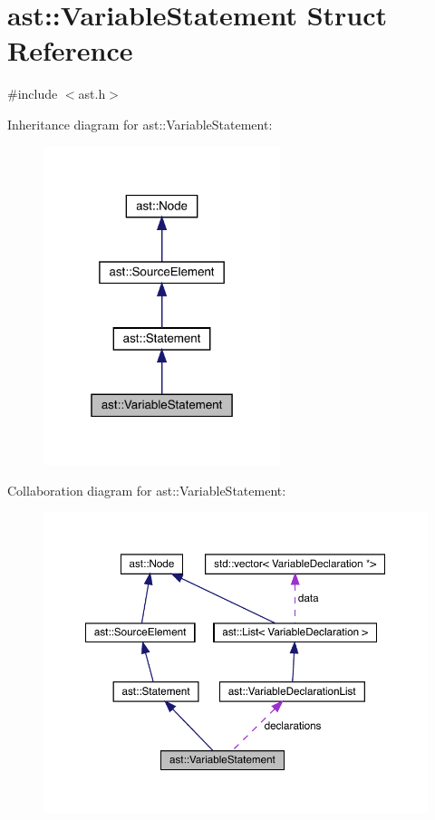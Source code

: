 \hypertarget{structast_1_1_variable_statement}{}\section{ast\+:\+:Variable\+Statement Struct Reference}
\label{structast_1_1_variable_statement}


{\ttfamily \#include $<$ast.\+h$>$}



Inheritance diagram for ast\+:\+:Variable\+Statement\+:
\nopagebreak
\begin{figure}[H]
\begin{center}
\leavevmode
\includegraphics[width=196pt]{structast_1_1_variable_statement__inherit__graph}
\end{center}
\end{figure}


Collaboration diagram for ast\+:\+:Variable\+Statement\+:
\nopagebreak
\begin{figure}[H]
\begin{center}
\leavevmode
\includegraphics[width=350pt]{structast_1_1_variable_statement__coll__graph}
\end{center}
\end{figure}
